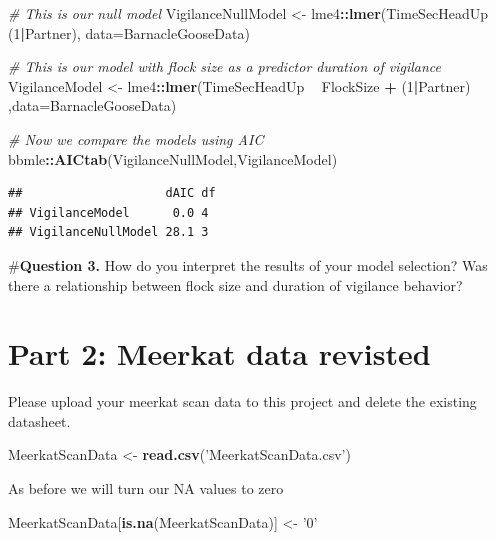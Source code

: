 \documentclass[]{book}
\newenvironment{Shaded}{\begin{snugshade}}{\end{snugshade}}
\newcommand{\CommentTok}[1]{\textcolor[rgb]{0.56,0.35,0.01}{\textit{#1}}}
\newcommand{\DataTypeTok}[1]{\textcolor[rgb]{0.13,0.29,0.53}{#1}}
\newcommand{\DecValTok}[1]{\textcolor[rgb]{0.00,0.00,0.81}{#1}}
\newcommand{\KeywordTok}[1]{\textcolor[rgb]{0.13,0.29,0.53}{\textbf{#1}}}
\newcommand{\NormalTok}[1]{#1}
\newcommand{\OperatorTok}[1]{\textcolor[rgb]{0.81,0.36,0.00}{\textbf{#1}}}
\newcommand{\StringTok}[1]{\textcolor[rgb]{0.31,0.60,0.02}{#1}}
\begin{document}
\begin{Shaded}
\begin{Highlighting}[]
\CommentTok{# This is our null model}
\NormalTok{VigilanceNullModel <-}\StringTok{ }\NormalTok{lme4}\OperatorTok{::}\KeywordTok{lmer}\NormalTok{(TimeSecHeadUp }\OperatorTok{~}\StringTok{ }\NormalTok{(}\DecValTok{1}\OperatorTok{|}\NormalTok{Partner), }\DataTypeTok{data=}\NormalTok{BarnacleGooseData)}

\CommentTok{# This is our model with flock size as a predictor duration of vigilance}
\NormalTok{VigilanceModel <-}\StringTok{ }\NormalTok{lme4}\OperatorTok{::}\KeywordTok{lmer}\NormalTok{(TimeSecHeadUp }\OperatorTok{~}\StringTok{ }\NormalTok{FlockSize }\OperatorTok{+}\StringTok{ }\NormalTok{(}\DecValTok{1}\OperatorTok{|}\NormalTok{Partner) ,}\DataTypeTok{data=}\NormalTok{BarnacleGooseData)}

\CommentTok{# Now we compare the models using AIC}
\NormalTok{bbmle}\OperatorTok{::}\KeywordTok{AICtab}\NormalTok{(VigilanceNullModel,VigilanceModel)}
\end{Highlighting}
\end{Shaded}

\begin{verbatim}
##                    dAIC df
## VigilanceModel      0.0 4 
## VigilanceNullModel 28.1 3
\end{verbatim}

\#\textbf{Question 3.} How do you interpret the results of your model selection? Was there a relationship between flock size and duration of vigilance behavior?

\hypertarget{part-2-meerkat-data-revisted}{%
\section{Part 2: Meerkat data revisted}\label{part-2-meerkat-data-revisted}}

Please upload your meerkat scan data to this project and delete the existing datasheet.

\begin{Shaded}
\begin{Highlighting}[]
\NormalTok{MeerkatScanData <-}\StringTok{ }\KeywordTok{read.csv}\NormalTok{(}\StringTok{'MeerkatScanData.csv'}\NormalTok{)}
\end{Highlighting}
\end{Shaded}

As before we will turn our NA values to zero

\begin{Shaded}
\begin{Highlighting}[]
\NormalTok{MeerkatScanData[}\KeywordTok{is.na}\NormalTok{(MeerkatScanData)] <-}\StringTok{ '0'}
\end{Highlighting}
\end{Shaded}
\end{document}
